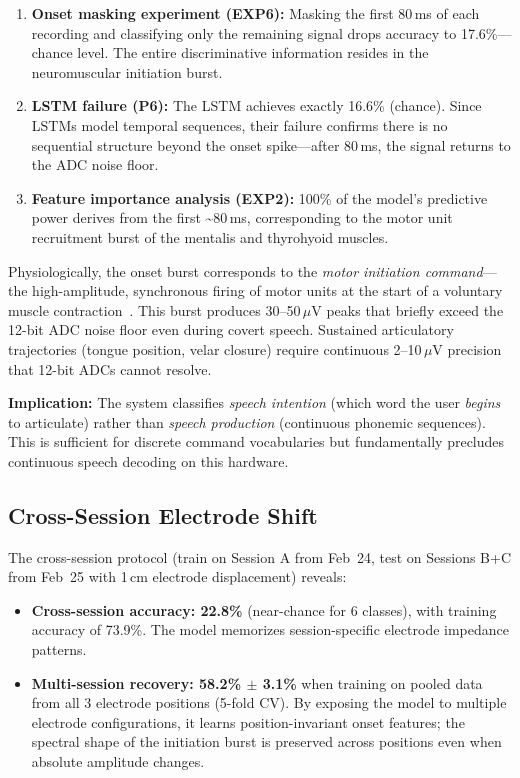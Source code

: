 \documentclass[11pt, a4paper]{article}
\begin{document}
\begin{enumerate}
    \item \textbf{Onset masking experiment (EXP6):} Masking the first 80\,ms of each recording and classifying only the remaining signal drops accuracy to 17.6\%---chance level. The entire discriminative information resides in the neuromuscular initiation burst.
    \item \textbf{LSTM failure (P6):} The LSTM achieves exactly 16.6\% (chance). Since LSTMs model temporal sequences, their failure confirms there is no sequential structure beyond the onset spike---after 80\,ms, the signal returns to the ADC noise floor.
    \item \textbf{Feature importance analysis (EXP2):} 100\% of the model's predictive power derives from the first \textasciitilde80\,ms, corresponding to the motor unit recruitment burst of the mentalis and thyrohyoid muscles.
\end{enumerate}

Physiologically, the onset burst corresponds to the \emph{motor initiation command}---the high-amplitude, synchronous firing of motor units at the start of a voluntary muscle contraction~\cite{jou2006}. This burst produces 30--50\,$\mu$V peaks that briefly exceed the 12-bit ADC noise floor even during covert speech. Sustained articulatory trajectories (tongue position, velar closure) require continuous 2--10\,$\mu$V precision that 12-bit ADCs cannot resolve.

\textbf{Implication:} The system classifies \emph{speech intention} (which word the user \emph{begins} to articulate) rather than \emph{speech production} (continuous phonemic sequences). This is sufficient for discrete command vocabularies but fundamentally precludes continuous speech decoding on this hardware.

\subsection{Cross-Session Electrode Shift}

The cross-session protocol (train on Session A from Feb~24, test on Sessions B+C from Feb~25 with 1\,cm electrode displacement) reveals:

\begin{itemize}
    \item \textbf{Cross-session accuracy: 22.8\%} (near-chance for 6 classes), with training accuracy of 73.9\%. The model memorizes session-specific electrode impedance patterns.
    \item \textbf{Multi-session recovery: 58.2\% $\pm$ 3.1\%} when training on pooled data from all 3 electrode positions (5-fold CV). By exposing the model to multiple electrode configurations, it learns position-invariant onset features; the spectral shape of the initiation burst is preserved across positions even when absolute amplitude changes.
\end{itemize}
\end{document}
